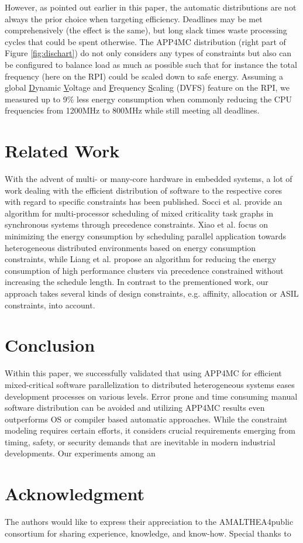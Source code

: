 \documentclass [a4paper,final,conference,10pt]{IDAACS}
\begin{document}
However, as pointed out earlier in this paper, the automatic distributions are not always the prior choice when targeting efficiency. Deadlines may be met comprehensively (the effect is the same), but long slack times waste processing cycles that could be spent otherwise. The APP4MC distribution (right part of Figure \ref{fig:dischart}) do not only considers any types of constraints but also can be configured to balance load as much as possible such that for instance the total frequency (here on the RPI) could be scaled down to safe energy. Assuming a global \underline{D}ynamic \underline{V}oltage and \underline{F}requency \underline{S}caling (DVFS) feature on the RPI, we measured up to 9\% less energy consumption when commonly reducing the CPU frequencies from 1200MHz to 800MHz while still meeting all deadlines.  %

\section{Related Work}
\label{sec:relatedWork}
With the advent of multi- or many-core hardware in embedded systems, a lot of work dealing with the efficient distribution of software to the respective cores with regard to specific constraints has been published. Socci et al. \cite{Socci2015} provide an algorithm for multi-processor scheduling of mixed criticality task graphs in synchronous systems through precedence constraints. 
Xiao et al. \cite{Xiao2016} focus on minimizing the energy consumption by scheduling parallel application towards heterogeneous distributed environments based on energy consumption constraints, while Liang et al. \cite{LiXi13} propose an algorithm for reducing the energy consumption of high performance clusters via precedence
constrained without increasing the schedule length. In contrast to the prementioned work, our approach takes several kinds of design constraints, e.g. affinity, allocation or ASIL constraints, into account.

 \cite{Kritikakou2014} 

\section{Conclusion}
\label{sec:concl}
Within this paper, we successfully validated that using APP4MC for efficient mixed-critical software parallelization to distributed heterogeneous systems eases development processes on various levels. Error prone and time consuming manual software distribution can be avoided and utilizing APP4MC results even outperforms OS or compiler based automatic approaches. While the constraint modeling requires certain efforts, it considers crucial requirements emerging from timing, safety, or security demands that are inevitable in modern industrial developments. Our experiments among an 


\section*{Acknowledgment}
The authors would like to express their appreciation to the AMALTHEA4public consortium for sharing experience, knowledge, and know-how. Special thanks to 


\end{document}
